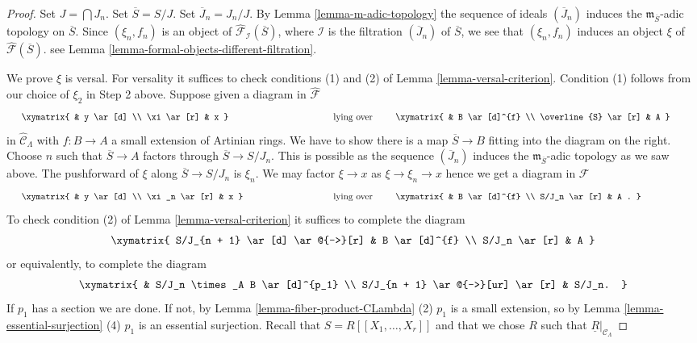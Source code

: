 \begin{proof}
\medskip\noindent
Set $J = \bigcap J_n$. Set $\overline{S} = S/J$. Set $\overline{J}_n = J_n/J$.
By
Lemma \ref{lemma-m-adic-topology}
the sequence of ideals $(\overline{J}_n)$ induces the
$\mathfrak m_{\overline{S}}$-adic topology on $\overline{S}$.
Since $(\xi_n, f_n)$ is an object of
$\widehat{\mathcal{F}}_\mathcal{I}(\overline{S})$, where $\mathcal{I}$
is the filtration $(\overline{J}_n)$ of $\overline{S}$,
we see that $(\xi_n, f_n)$
induces an object $\xi$ of $\widehat{\mathcal{F}}(\overline{S})$.
see
Lemma \ref{lemma-formal-objects-different-filtration}.

\medskip\noindent
We prove $\xi$ is versal. For versality it suffices to check
conditions (1) and (2) of
Lemma \ref{lemma-versal-criterion}.
Condition (1) follows from our choice of $\xi_2$ in Step 2 above.
Suppose given a diagram in $\widehat{\mathcal{F}}$
$$
\vcenter{
\xymatrix{
            &  y \ar[d] \\
\xi \ar[r]  &  x
}
}
\quad\text{lying over}\quad
\vcenter{
\xymatrix{
         &   B  \ar[d]^{f} \\
\overline{S} \ar[r] &   A
}
}
$$
in $\widehat{\mathcal{C}}_\Lambda$ with $f: B \to A$ a small extension
of Artinian rings. We have to show there is a map $\overline{S} \to B$ fitting
into the diagram on the right. Choose $n$ such that
$\overline{S} \to A$ factors through $\overline{S} \to S/J_n$. This is
possible as the sequence $(\overline{J}_n)$ induces the
$\mathfrak m_{\overline{S}}$-adic topology as we saw above.
The pushforward of $\xi$ along $\overline{S} \to S/J_n$ is $\xi_n$.
We may factor $\xi \to x$ as $\xi \to \xi_n \to x$ hence we get a diagram
in $\mathcal{F}$
$$
\vcenter{
\xymatrix{
            &  y \ar[d] \\
\xi_n \ar[r]  &  x
}
}
\quad\text{lying over}\quad
\vcenter{
\xymatrix{
         &   B  \ar[d]^{f} \\
S/J_n \ar[r] &   A .
}
}
$$
To check condition (2) of
Lemma \ref{lemma-versal-criterion}
it suffices to complete the diagram
$$
\xymatrix{
S/J_{n + 1} \ar[d] \ar@{-->}[r] & B \ar[d]^{f} \\
S/J_n   \ar[r] & A
}
$$
or equivalently, to complete the diagram
$$
\xymatrix{
  &  S/J_n \times_A B \ar[d]^{p_1} \\
S/J_{n + 1} \ar@{-->}[ur] \ar[r] &  S/J_n.
}
$$
If $p_1$ has a section we are done. If not, by
Lemma \ref{lemma-fiber-product-CLambda} (2)
$p_1$ is a small extension, so by
Lemma \ref{lemma-essential-surjection} (4)
$p_1$ is an essential surjection. Recall that $S = R[[X_1, \ldots, X_r]]$
and that we chose $R$ such that $\underline{R}|_{\mathcal{C}_\Lambda}$

\end{proof}
